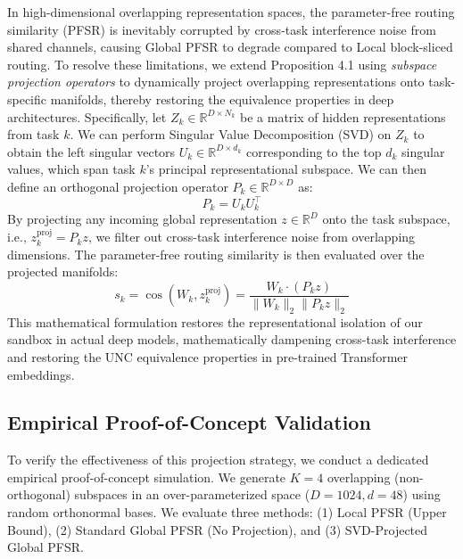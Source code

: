 \documentclass{article}
\theoremstyle{plain}
\theoremstyle{definition}
\theoremstyle{remark}
\begin{document}
In high-dimensional overlapping representation spaces, the parameter-free routing similarity (PFSR) is inevitably corrupted by cross-task interference noise from shared channels, causing Global PFSR to degrade compared to Local block-sliced routing.
To resolve these limitations, we extend Proposition 4.1 using \emph{subspace projection operators} to dynamically project overlapping representations onto task-specific manifolds, thereby restoring the equivalence properties in deep architectures. Specifically, let $Z_k \in \mathbb{R}^{D \times N_k}$ be a matrix of hidden representations from task $k$. We can perform Singular Value Decomposition (SVD) on $Z_k$ to obtain the left singular vectors $U_k \in \mathbb{R}^{D \times d_k}$ corresponding to the top $d_k$ singular values, which span task $k$'s principal representational subspace. We can then define an orthogonal projection operator $P_k \in \mathbb{R}^{D \times D}$ as:
\begin{equation}
P_k = U_k U_k^\top
\end{equation}
By projecting any incoming global representation $z \in \mathbb{R}^D$ onto the task subspace, i.e., $z^{\text{proj}}_k = P_k z$, we filter out cross-task interference noise from overlapping dimensions. The parameter-free routing similarity is then evaluated over the projected manifolds:
\begin{equation}
s_k = \cos(W_k, z^{\text{proj}}_k) = \frac{W_k \cdot (P_k z)}{\|W_k\|_2 \|P_k z\|_2}
\end{equation}
This mathematical formulation restores the representational isolation of our sandbox in actual deep models, mathematically dampening cross-task interference and restoring the UNC equivalence properties in pre-trained Transformer embeddings.

\subsection{Empirical Proof-of-Concept Validation}
To verify the effectiveness of this projection strategy, we conduct a dedicated empirical proof-of-concept simulation. We generate $K=4$ overlapping (non-orthogonal) subspaces in an over-parameterized space ($D=1024, d=48$) using random orthonormal bases. We evaluate three methods: (1) Local PFSR (Upper Bound), (2) Standard Global PFSR (No Projection), and (3) SVD-Projected Global PFSR. 
\end{document}
